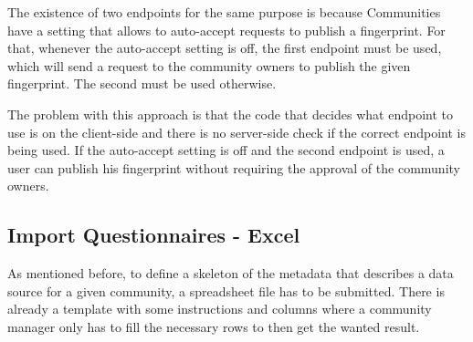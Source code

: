 The existence of two endpoints for the same purpose is because Communities have a setting that allows to auto-accept requests to publish a fingerprint.
For that, whenever the auto-accept setting is off, the first endpoint must be used, which will send a request to the community owners to publish the given fingerprint.
The second must be used otherwise.

The problem with this approach is that the code that decides what endpoint to use is on the client-side and there is no server-side check if the correct endpoint is being used.
If the auto-accept setting is off and the second endpoint is used, a user can publish his fingerprint without requiring the approval of the community owners.

\subsection{Import Questionnaires - Excel}
\label{subsection:excel}


As mentioned before, to define a skeleton of the metadata that describes a data source for a given community, a spreadsheet file has to be submitted.
There is already a template with some instructions and columns where a community manager only has to fill the necessary rows to then get the wanted result.

